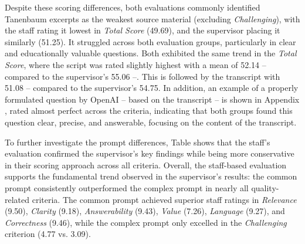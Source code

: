 Despite these scoring differences, both evaluations commonly identified Tanenbaum excerpts as the weakest source material (excluding \textit{Challenging}), with the staff rating it lowest in \textit{Total Score} (49.69), and the supervisor placing it similarly (51.25). It struggled across both evaluation groups, particularly in clear and educationally valuable questions. Both exhibited the same trend in the \textit{Total Score}, where the script was rated slightly highest with a mean of 52.14 -- compared to the supervisor's 55.06 --. This is followed by the transcript with 51.08 -- compared to the supervisor's 54.75. In addition, an example of a properly formulated question by OpenAI -- based on the transcript -- is shown in Appendix , rated almost perfect across the criteria, indicating that both groups found this question clear, precise, and answerable, focusing on the content of the transcript.

To further investigate the prompt differences, Table  shows that the staff's evaluation confirmed the supervisor's key findings while being more conservative in their scoring approach across all criteria. Overall, the staff-based evaluation supports the fundamental trend observed in the supervisor's results: the common prompt consistently outperformed the complex prompt in nearly all quality-related criteria. The common prompt achieved superior staff ratings in \textit{Relevance} (9.50), \textit{Clarity} (9.18), \textit{Answerability} (9.43), \textit{Value} (7.26), \textit{Language} (9.27), and \textit{Correctness} (9.46), while the complex prompt only excelled in the \textit{Challenging} criterion (4.77 vs. 3.09).

